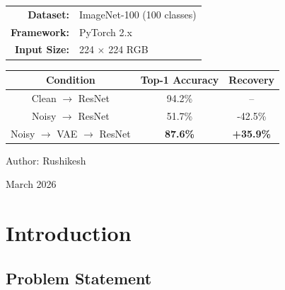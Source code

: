 \documentclass[11pt,a4paper]{article}
\begin{document}
\begin{titlepage}
    \vspace{2cm}

    {\large
    \begin{tabular}{rl}
        \textbf{Dataset:} & ImageNet-100 (100 classes) \\
        \textbf{Framework:} & PyTorch 2.x \\
        \textbf{Input Size:} & 224 $\times$ 224 RGB \\
    \end{tabular}
    \par}

    \vspace{1cm}

    \begin{tabular}{|c|c|c|}
        \hline
        \rowcolor{gray!20}
        \textbf{Condition} & \textbf{Top-1 Accuracy} & \textbf{Recovery} \\
        \hline
        Clean $\rightarrow$ ResNet & 94.2\% & -- \\
        Noisy $\rightarrow$ ResNet & 51.7\% & -42.5\% \\
        \rowcolor{healedgreen!20}
        Noisy $\rightarrow$ VAE $\rightarrow$ ResNet & \textbf{87.6\%} & \textbf{+35.9\%} \\
        \hline
    \end{tabular}

    \vfill

    {\large Author: Rushikesh\par}
    {\large March 2026\par}

\end{titlepage}


\tableofcontents
\newpage


\section{Introduction}
\label{sec:introduction}

\subsection{Problem Statement}
\end{document}

